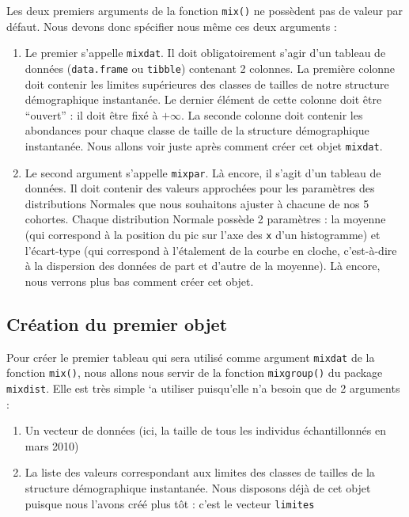 \documentclass[
  french,
  a4paper,
  DIV=11,
  numbers=noendperiod,
  oneside]{scrreprt}
\providecommand{\tightlist}{%
  \setlength{\itemsep}{0pt}\setlength{\parskip}{0pt}}
\begin{document}
\begin{tcolorbox}
{\begin{footnotesize}
\end{footnotesize}}

Les deux premiers arguments de la fonction \texttt{mix()} ne possèdent
pas de valeur par défaut. Nous devons donc spécifier nous même ces deux
arguments :

\begin{enumerate}
\def\labelenumi{\arabic{enumi}.}
\tightlist
\item
  Le premier s'appelle \texttt{mixdat}. Il doit obligatoirement s'agir
  d'un tableau de données (\texttt{data.frame} ou \texttt{tibble})
  contenant 2 colonnes. La première colonne doit contenir les limites
  supérieures des classes de tailles de notre structure démographique
  instantanée. Le dernier élément de cette colonne doit être ``ouvert''
  : il doit être fixé à \(+\infty\). La seconde colonne doit contenir
  les abondances pour chaque classe de taille de la structure
  démographique instantanée. Nous allons voir juste après comment créer
  cet objet \texttt{mixdat}.
\item
  Le second argument s'appelle \texttt{mixpar}. Là encore, il s'agit
  d'un tableau de données. Il doit contenir des valeurs approchées pour
  les paramètres des distributions Normales que nous souhaitons ajuster
  à chacune de nos 5 cohortes. Chaque distribution Normale possède 2
  paramètres : la moyenne (qui correspond à la position du pic sur l'axe
  des \texttt{x} d'un histogramme) et l'écart-type (qui correspond à
  l'étalement de la courbe en cloche, c'est-à-dire à la dispersion des
  données de part et d'autre de la moyenne). Là encore, nous verrons
  plus bas comment créer cet objet.
\end{enumerate}

\subsection{Création du premier
objet}\label{cruxe9ation-du-premier-objet}

Pour créer le premier tableau qui sera utilisé comme argument
\texttt{mixdat} de la fonction \texttt{mix()}, nous allons nous servir
de la fonction \texttt{mixgroup()} du package \texttt{mixdist}. Elle est
très simple `a utiliser puisqu'elle n'a besoin que de 2 arguments :

\begin{enumerate}
\def\labelenumi{\arabic{enumi}.}
\tightlist
\item
  Un vecteur de données (ici, la taille de tous les individus
  échantillonnés en mars 2010)
\item
  La liste des valeurs correspondant aux limites des classes de tailles
  de la structure démographique instantanée. Nous disposons déjà de cet
  objet puisque nous l'avons créé plus tôt : c'est le vecteur
  \texttt{limites}
\end{enumerate}


\end{tcolorbox}
\end{document}
